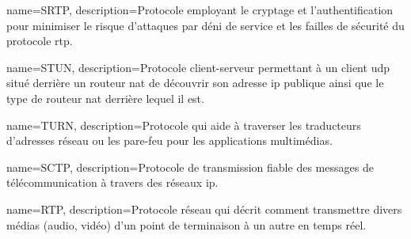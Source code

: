 {
  name=SRTP,
  description={Protocole employant le cryptage et l'authentification pour minimiser le risque d'attaques par déni de service et les failles de sécurité du protocole \gls{rtp}.}
}

{
  name=STUN,
  description={Protocole client-serveur permettant à un client \gls{udp} situé derrière un routeur \gls{nat} de découvrir son adresse \gls{ip} publique ainsi que le type de routeur \gls{nat} derrière lequel il est.}
}

{
  name=TURN,
  description={Protocole qui aide à traverser les traducteurs d'adresses réseau ou les pare-feu pour les applications multimédias.}
}

{
  name=SCTP,
  description={Protocole de transmission fiable des messages de télécommunication à travers des réseaux \gls{ip}.}
}

{
  name=RTP,
  description={Protocole réseau qui décrit comment transmettre divers médias (audio, vidéo) d'un point de terminaison à un autre en temps réel. }
}







